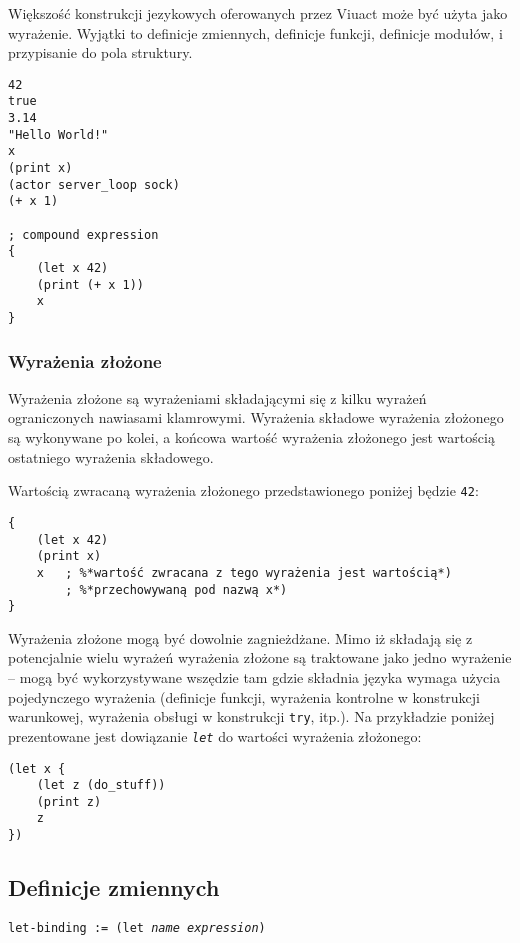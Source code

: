 Większość konstrukcji jezykowych oferowanych przez Viuact może być użyta jako wyrażenie.
Wyjątki to definicje zmiennych, definicje funkcji, definicje modułów, i przypisanie do pola struktury.

\begin{lstlisting}
42
true
3.14
"Hello World!"
x
(print x)
(actor server_loop sock)
(+ x 1)

; compound expression
{
    (let x 42)
    (print (+ x 1))
    x
}
\end{lstlisting}

\subsubsection{Wyrażenia złożone}

Wyrażenia złożone są wyrażeniami składającymi się z kilku wyrażeń ograniczonych nawiasami klamrowymi.
Wyrażenia składowe wyrażenia złożonego są wykonywane po kolei, a końcowa wartość wyrażenia złożonego jest
wartością ostatniego wyrażenia składowego.

Wartością zwracaną wyrażenia złożonego przedstawionego poniżej będzie \texttt{42}:

\begin{lstlisting}
{
    (let x 42)
    (print x)
    x   ; %*wartość zwracana z tego wyrażenia jest wartością*)
        ; %*przechowywaną pod nazwą x*)
}
\end{lstlisting}

Wyrażenia złożone mogą być dowolnie zagnieżdżane. Mimo iż składają się z potencjalnie wielu wyrażeń
wyrażenia złożone są traktowane jako jedno wyrażenie -- mogą być wykorzystywane wszędzie tam gdzie składnia
języka wymaga użycia pojedynczego wyrażenia (definicje funkcji, wyrażenia kontrolne w konstrukcji warunkowej,
wyrażenia obsługi w konstrukcji \texttt{try}, itp.). Na przykładzie poniżej prezentowane jest dowiązanie
\emph{\texttt{let}} do wartości wyrażenia złożonego:

\begin{lstlisting}
(let x {
    (let z (do_stuff))
    (print z)
    z
})
\end{lstlisting}

\subsection{Definicje zmiennych}

\texttt{let-binding := (let \emph{name} \emph{expression})}
\vspace{1em}

